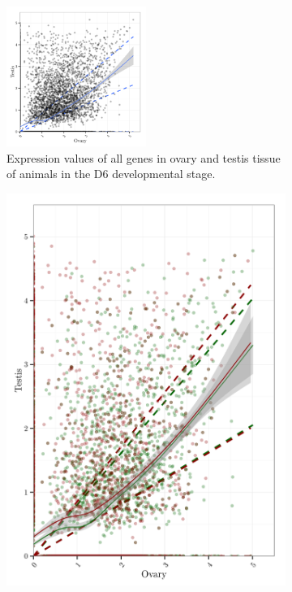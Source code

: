 \documentclass[11pt,twoside,a4paper]{report}
\begin{document}
		\begin{figure}[h!]
			\centering
			\begin{subfigure}{1\textwidth}
				\centering
				\includegraphics[width=0.5\textwidth]{pngs/D6_expression.png}
				\caption{Expression values of all genes in ovary and testis tissue of animals in the D6 developmental stage.}
			\end{subfigure}
			\begin{subfigure}{0.5\textwidth}
				\centering
				\includegraphics[width=1\linewidth]{pngs/E2F_specific_Female_expression.png}

\end{subfigure}
\end{figure}
\end{document}
